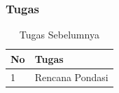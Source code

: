 \documentclass[../main.tex]{subfiles}
\begin{document}
\begin{frame}[mytitle=standard,t,mycolor=digiPH_creamy,dark]
	\frametitle{Tugas}
	\begin{table}[htb]
		\caption{Tugas Sebelumnya}
		\begin{tabularx}{\textwidth}{|p{1cm}|X|}
			\hline
			\textbf{No} & \textbf{Tugas}  \\ \hline
			1           & Rencana Pondasi \\ \hline
		\end{tabularx}
	\end{table}
\end{frame}
\end{document}
